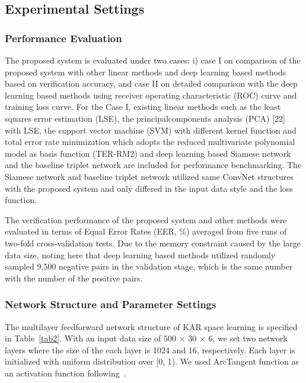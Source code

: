 \documentclass[runningheads]{llncs}
\begin{document}
\subsection{Experimental Settings}

\subsubsection{Performance Evaluation}
The proposed system is evaluated under two cases: i) case I on comparison of the proposed system with other linear methods and deep learning based methods based on verification accuracy, and case II on detailed comparison with the deep learning based methods using receiver operating characteristic (ROC) curve and training loss curve. For the Case I, existing linear methods such as the least squares error estimation (LSE), the principalcomponents analysis (PCA) [22] with LSE, the support vector machine (SVM) with different kernel function and total error rate minimization which adopts the reduced multivariate polynomial model as basis function (TER-RM2) \cite{toh2003fingerprint,toh2008between} and deep learning based Siamese network \cite{koch2015siamese} and the baseline triplet network \cite{hoffer2015deep} are included for performance benchmarking. The Siamese network and baseline triplet network utilized same ConvNet structures with the proposed system and only differed in the input data style and the loss function.

The verification performance of the proposed system and other methods were evaluated in terms of Equal Error Rates (EER, \%) averaged from five runs of two-fold cross-validation tests. Due to the memory constraint caused by the large data size, noting here that deep learning based methods utilized randomly sampled 9,500 negative pairs in the validation stage, which is the same number with the number of the positive pairs.

\subsubsection{Network Structure and Parameter Settings}
The multilayer feedforward network structure of KAR space learning is specified in Table~\ref{tab2}. With an input data size of 500 $\times$ 30 $\times$ 6, we set two network layers where the size of the each layer is 1024 and 16, respectively. Each layer is initialized with uniform distribution over [0, 1). We used ArcTangent function as an activation function following~\cite{toh2018gradient}.
\end{document}
